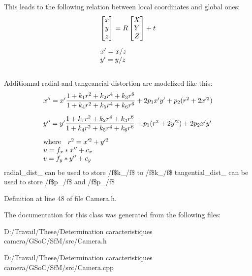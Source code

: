 This leads to the following relation between local coordinates and global ones: \[ \begin{array}{l} \vspace{10pt} \begin{bmatrix} x \\ y \\ z \end{bmatrix} = R \begin{bmatrix} X \\ Y \\ Z \end{bmatrix} + t \\ x' = x/z \\ y' = y/z \vspace{10pt} \end{array} \]

Additionnal radial and tangeancial distortion are modelized like this: \[ \begin{array}{l} \vspace{10pt} x'' = x' \dfrac{1 + k_1 r^2 + k_2 r^4 + k_3 r^6}{1 + k_4 r^2 + k_5 r^4 + k_6 r^6} + 2 p_1 x' y' + p_2(r^2 + 2 x'^2) \\ \vspace{10pt} y'' = y' \dfrac{1 + k_1 r^2 + k_2 r^4 + k_3 r^6}{1 + k_4 r^2 + k_5 r^4 + k_6 r^6} + p_1 (r^2 + 2 y'^2) + 2 p_2 x' y' \\ \text{where} \quad r^2 = x'^2 + y'^2 \\ u = f_x*x'' + c_x \\ v = f_y*y'' + c_y \end{array} \] radial\_\-dist\_\- can be used to store /f\$k\_/f\$ to /f\$k\_/f\$ tangential\_\-dist\_\- can be used to store /f\$p\_/f\$ and /f\$p\_/f\$ 

Definition at line 48 of file Camera.h.



The documentation for this class was generated from the following files:\begin{DoxyCompactItemize}
\item 
D:/Travail/These/Determination caracteristiques camera/GSoC/SfM/src/Camera.h\item 
D:/Travail/These/Determination caracteristiques camera/GSoC/SfM/src/Camera.cpp\end{DoxyCompactItemize}
